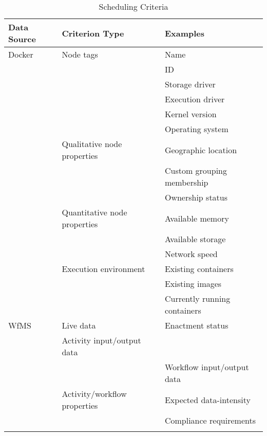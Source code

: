   \begin{table}[!htbp]
    \centering
    \begin{tabular}{l l l}
      \toprule
      Data Source & Criterion Type & Examples \\
      \midrule
      Docker
        & Node tags
          & Name \\
          && \ac{ID} \\
          && Storage driver \\
          && Execution driver \\
          && Kernel version  \\
          && Operating system \\ [1.2ex]
        & Qualitative node properties
          & Geographic location\\
          && Custom grouping membership\\
          && Ownership status\\ [1.2ex]
        & Quantitative node properties
          & Available memory \\
          && Available storage \\
          && Network speed \\ [1.2ex]
        & Execution environment
          & Existing containers \\
          && Existing images \\
          && Currently running containers \\ [1.4ex]
      WfMS
        & Live data
          & Enactment status \\
          & Activity input/output data \\
          && Workflow input/output data \\ [1.2ex]
        & Activity/workflow properties
          & Expected data-intensity \\
          && Compliance requirements\\
          &&\\ [1.2ex]
      \bottomrule
    \end{tabular}
    \label{tab:scheduling_criteria}
    \caption{Scheduling Criteria}
  \end{table}

